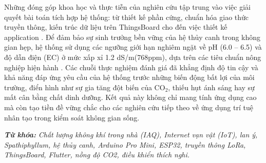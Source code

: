 Những đóng góp khoa học và thực tiễn của nghiên cứu tập trung vào việc giải quyết bài toán tích hợp hệ thống: từ thiết kế phần cứng, chuẩn hóa giao thức truyền thông, kiến trúc dữ liệu trên ThingsBoard cho đến việc thiết kế application . Để đảm bảo sự sinh trưởng bền vững của hệ thủy canh trong không gian hẹp, hệ thống sử dụng các ngưỡng giới hạn nghiêm ngặt về pH (6.0 – 6.5) và độ dẫn điện (EC) ở mức xấp xỉ 1.2 dS/m(768ppm), dựa trên các tiêu chuẩn nông nghiệp hiện hành \cite{peace_lily_hydro_brightlane,peace_lily_ec_ppf}. Các chuỗi thực nghiệm đánh giá đã khẳng định độ tin cậy và khả năng đáp ứng yêu cầu của hệ thống trước những biến động bất lợi của môi trường, điển hình như sự gia tăng đột biến của CO$_2$, thiếu hụt ánh sáng hay sự mất cân bằng chất dinh dưỡng. Kết quả này không chỉ mang tính ứng dụng cao mà còn tạo tiền đề vững chắc cho các nghiên cứu tiếp theo về ứng dụng trí tuệ nhân tạo trong kiểm soát không gian sống.

\textbf{\textit{Từ khóa: }} \textit{Chất lượng không khí trong nhà (IAQ), Internet vạn vật (IoT), lan ý, Spathiphyllum, hệ thủy canh, Arduino Pro Mini, ESP32, truyền thông LoRa, ThingsBoard, Flutter, nồng độ CO2, điều khiển thích nghi.}
